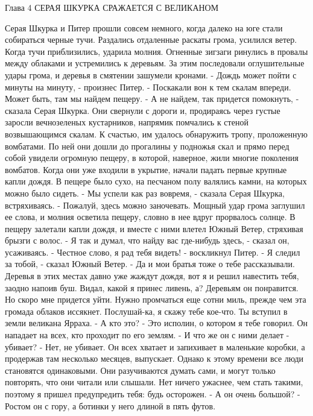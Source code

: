 Глава 4
        СЕРАЯ ШКУРКА СРАЖАЕТСЯ С ВЕЛИКАНОМ

    Серая Шкурка и Питер прошли совсем немного, когда далеко на юге 
стали собираться черные тучи. Раздались отдаленные раскаты грома, 
усилился ветер. Когда тучи приблизились, ударила молния. Огненные 
зигзаги ринулись в провалы между облаками и устремились к деревьям. За 
этим последовали оглушительные удары грома, и деревья в смятении 
зашумели кронами.
    - Дождь может пойти с минуты на минуту, - произнес Питер. - 
Поскакали вон к тем скалам впереди. Может быть, там мы найдем пещеру.
    - А не найдем, так придется помокнуть, - сказала Серая Шкурка.
    Они свернули с дороги и, продираясь через густые заросли 
вечнозеленых кустарников, напрямик помчались к стеной возвышающимся 
скалам. К счастью, им удалось обнаружить тропу, проложенную вомбатами. 
По ней они дошли до прогалины у подножья скал и прямо перед собой 
увидели огромную пещеру, в которой, наверное, жили многие поколения 
вомбатов.
    Когда они уже входили в укрытие, начали падать первые крупные 
капли дождя. В пещере было сухо, на песчаном полу валялись камни, на 
которых можно было сидеть.
    - Мы успели как раз вовремя, - сказала Серая Шкурка, встряхиваясь. 
- Пожалуй, здесь можно заночевать.
    Мощный удар грома заглушил ее слова, и молния осветила пещеру, 
словно в нее вдруг прорвалось солнце. В пещеру залетали капли дождя, и 
вместе с ними влетел Южный Ветер, стряхивая брызги с волос.
    - Я так и думал, что найду вас где-нибудь здесь, - сказал он, 
усаживаясь.
    - Честное слово, я рад тебя видеть! - воскликнул Питер.
    - Я следил за тобой, - сказал Южный Ветер. - Да и мои братья тоже 
о тебе рассказывали. Деревья в этих местах давно уже жаждут дождя, вот 
я и решил навестить тебя, заодно напоив буш. Видал, какой я принес 
ливень, а? Деревьям он понравится. Но скоро мне придется уйти. Нужно 
промчаться еще сотни миль, прежде чем эта громада облаков иссякнет. 
Послушай-ка, я скажу тебе кое-что. Ты вступил в земли великана Ярраха.
    - А кто это?
    - Это исполин, о котором я тебе говорил. Он нападает на всех, кто 
проходит по его землям.
    - И что же он с ними делает - убивает?
    - Нет, не убивает. Он всех хватает и запихивает в маленькие 
коробки, а продержав там несколько месяцев, выпускает. Однако к этому 
времени все люди становятся одинаковыми. Они разучиваются думать сами, 
и могут только повторять, что они читали или слышали. Нет ничего 
ужаснее, чем стать такими, поэтому я пришел предупредить тебя: будь 
осторожен.
    - А он очень большой?
    - Ростом он с гору, а ботинки у него длиной в пять футов.
